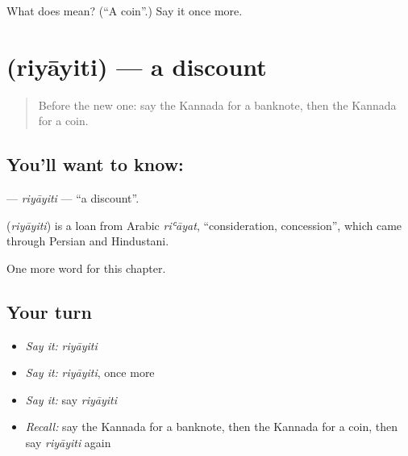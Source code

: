 \begin{tcolorbox}[breakable,colback=teal!4,colframe=teal!35!black,title={Before you move on}]
What does  mean? (\textquotedblleft{}A coin\textquotedblright{}.) Say it once more.
\end{tcolorbox}
\section[\texorpdfstring{\kn{ರಿಯಾಯಿತಿ} (riyāyiti)}{ರಿಯಾಯಿತಿ (riyāyiti)}]{ (riyāyiti) — a discount}

\label{lesson:KA-C185-riyayiti}



\begin{quote}
Before the new one: say the Kannada for a banknote, then the Kannada for a coin.
\end{quote}

\subsection*{You'll want to know: }
\textbf{} — \emph{riyāyiti} — \textquotedblleft{}a discount\textquotedblright{}.

\begin{cousinweb}
\textbf{} (\emph{riyāyiti}) is a loan from Arabic \emph{riʿāyat}, \textquotedblleft{}consideration, concession\textquotedblright{}, which came through Persian and Hindustani.
\end{cousinweb}

\begin{grammarlens}[title={What you've built}]
One more word for this chapter.
\end{grammarlens}

\subsection*{Your turn}
\begin{itemize}
\raggedright
  \item \emph{Say it:} \emph{riyāyiti}
  \item \emph{Say it:} \emph{riyāyiti}, once more
  \item \emph{Say it:} say \emph{riyāyiti}
  \item \emph{Recall:} say the Kannada for a banknote, then the Kannada for a coin, then say \emph{riyāyiti} again
\end{itemize}

